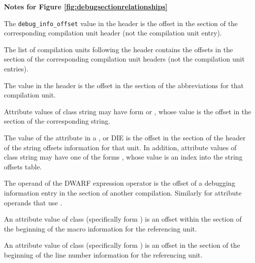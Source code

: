 \clearpage
\begin{center}
   \textbf{Notes for Figure \ref{fig:debugsectionrelationships}}
\end{center}
\begin{description} 
The \texttt{debug\_info\_offset} value in
the header is
the offset in the \dotdebuginfo{} section of the
corresponding compilation unit header (not the compilation
unit entry).

The list of compilation units following the header contains the offsets in the
\dotdebuginfo{} section of the 
corresponding compilation unit headers (not
the compilation unit entries). 

The \HFNdebugabbrevoffset{} value in the header is the offset in the
\dotdebugabbrev{} 
section of the abbreviations for that compilation unit.

Attribute values of class string may have form \DWFORMstrp{}
\bb
or \DWFORMstrpeight{},
\eb
whose value is the offset in the \dotdebugstr{}
section of the corresponding string.

The value of the 
\bb
\DWATstroffsets{} 
\eb
attribute in a
\DWTAGcompileunit{}, \DWTAGtypeunit{} or \DWTAGpartialunit{} 
DIE is the offset in the
\dotdebugstroffsets{} section of the 
\bb
header of the string offsets information
\eb
{}
for that unit.
In addition, attribute values of class string may have 
one of the forms 
\DWFORMstrxXNor, whose value is an index into the
string offsets table.

The operand of the \DWOPcallref{} 
DWARF expression operator is the
offset of a debugging information entry in the 
\dotdebuginfo{} section of another compilation.
Similarly for attribute operands that use
\DWFORMrefaddr.

An attribute value of class 
 (specifically form
\DWFORMsecoffset) is an 
offset within the 
\dotdebugmacro{} section
of the beginning of the macro information for the referencing unit.

An attribute value of class 
 (specifically form
\DWFORMsecoffset) 
is an offset in the 
\dotdebugline{} section of the
beginning of the line number information for the referencing unit.


\end{description}
